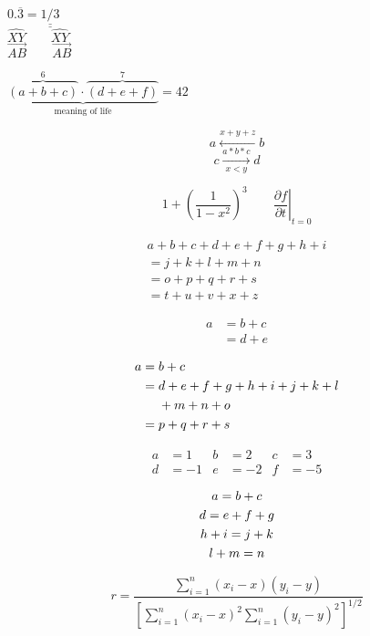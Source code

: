 \documentclass[]{ctexart}
\begin{document}
	$0.\overline{3} =
	\underline{\underline{1/3}}$ \\[5pt]
	$\hat{XY} \qquad \widehat{XY}$\\[5pt]
	$\vec{AB} \qquad
	\overrightarrow{AB}$

	$\underbrace{\overbrace{(a+b+c)}^6
	\cdot \overbrace{(d+e+f)}^7}
	_\text{meaning of life} = 42$

	\[a\xleftarrow{x+y+z} b \]
	\[c\xrightarrow[x<y]{a*b*c}d \]

	\[1 + \left(\frac{1}{1-x^{2}}
	\right)^3 \qquad
	\left.\frac{\partial f}{\partial t}
	\right|_{t=0}\]

	\begin{multline}
		a + b + c + d + e + f
		+ g + h + i \\
		= j + k + l + m + n\\
		= o + p + q + r + s\\
		= t + u + v + x + z
	\end{multline}

	\begin{align}
		a & = b + c \\
		& = d + e
	\end{align}

	\begin{align}
		a ={} & b + c \\
		={} & d + e + f + g + h + i
		+ j + k + l \notag \\
		& + m + n + o \\
		={} & p + q + r + s
	\end{align}

	\begin{align}
		a &=1
		&
		b &=2
		& c &=3
		\\
		d &=-1 &
		e &=-2
		& f &=-5
	\end{align}

	\begin{gather}
		a = b + c \\
		d = e + f + g \\
		h + i = j + k \notag \\
		l + m = n
	\end{gather}

	\[
		r = \frac
		{\sum_{i=1}^n (x_i- x)(y_i- y)}
		{\displaystyle \left[
			\sum_{i=1}^n (x_i-x)^2
			\sum_{i=1}^n (y_i-y)^2
			\right]^{1/2} }
	\]
\end{document}
